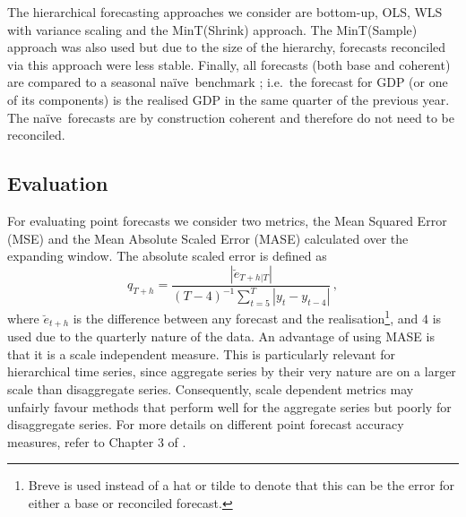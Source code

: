\documentclass[graybox]{svmult}
\def\naive{na\"{i}ve\ }
\begin{document}
The hierarchical forecasting approaches we consider are bottom-up, OLS, WLS with variance scaling and the MinT(Shrink) approach. The MinT(Sample) approach was also used but due to the size of the hierarchy, forecasts reconciled via this approach were less stable. Finally, all forecasts (both base and coherent) are compared to a seasonal \naive benchmark \citep{HynAth2018}; i.e.\ the forecast for GDP (or one of its components) is the realised GDP in the same quarter of the previous year. The \naive forecasts are by construction coherent and therefore do not need to be reconciled.

\subsection{Evaluation}

For evaluating point forecasts we consider two metrics, the Mean Squared Error (MSE) and the Mean Absolute Scaled Error (MASE) calculated over the expanding window. The absolute scaled error is defined as
\begin{equation*}
	q_{T+h} = \frac{|\breve{e}_{T+h|T}|}{(T-4)^{-1}\sum_{t=5}^{T}|y_t - y_{t-4}|}\,,
\end{equation*}
where $\breve{e}_{t+h}$ is the difference between any forecast and the realisation\footnote{Breve is used instead of a hat or tilde to denote that this can be the error for either a base or reconciled forecast.}, and $4$ is used due to the quarterly nature of the data. An advantage of using MASE is that it is a scale independent measure. This is particularly relevant for hierarchical time series, since aggregate series by their very nature are on a larger scale than disaggregate series. Consequently, scale dependent metrics may unfairly favour methods that perform well for the aggregate series but poorly for disaggregate series. For more details on different point forecast accuracy measures, refer to Chapter 3 of \citet{HynAth2018}.
\end{document}
